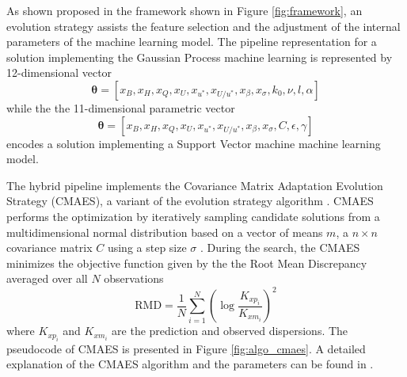 \documentclass[a4paper,12pt, english]{article}
\newcommand{\xp}{\bm{\theta}}
\begin{document}
As shown proposed in the framework shown in Figure \ref{fig:framework}, an evolution strategy assists the feature selection and the adjustment of the internal parameters of the machine learning model.  
The pipeline representation for a solution implementing the Gaussian Process machine learning is represented by 12-dimensional vector
$$\xp = [ x_{B}, x_{H}, x_{Q}, x_{U}, x_{u^*}, x_{U/u^*}, x_{\beta}, x_{\sigma}, {k_0}, {\nu}, {l}, {\alpha} ]$$
while the the 11-dimensional parametric vector 
$$\xp = [ x_{B}, x_{H}, x_{Q}, x_{U}, x_{u^*}, x_{U/u^*}, x_{\beta}, x_{\sigma}, {C}, {\epsilon}, {\gamma}] $$
encodes a  solution implementing a Support Vector machine machine learning model.

The hybrid pipeline implements the Covariance Matrix Adaptation Evolution Strategy (CMAES), a variant of the evolution strategy algorithm \cite{hansen:2001}. CMAES performs the optimization by iteratively sampling candidate solutions from a multidimensional normal distribution based on a vector  of means $m$, a  $n \times n$ covariance matrix $C$ using a step size $\sigma$ \cite{beyer:2002}. 
{\color{red}
During the search, the CMAES minimizes the objective function given by the 
the Root Mean Discrepancy averaged over all $N$ observations 
\begin{equation}
 \label{eq:rmdr}
 \mbox{RMD} = \frac{1}{N} \sum_{i=1}^{N} \left( \log{ \frac{K_{xp_i}}{K_{xm_i}} } \right)^2 
\end{equation} 
% 
where $K_{xp_i}$ and $K_{xm_i}$ are the prediction and observed dispersions.
}
The pseudocode of CMAES is presented in Figure \ref{fig:algo_cmaes}. A detailed explanation of the CMAES algorithm and the parameters can be found in \cite{Li:2018}.
\end{document}
